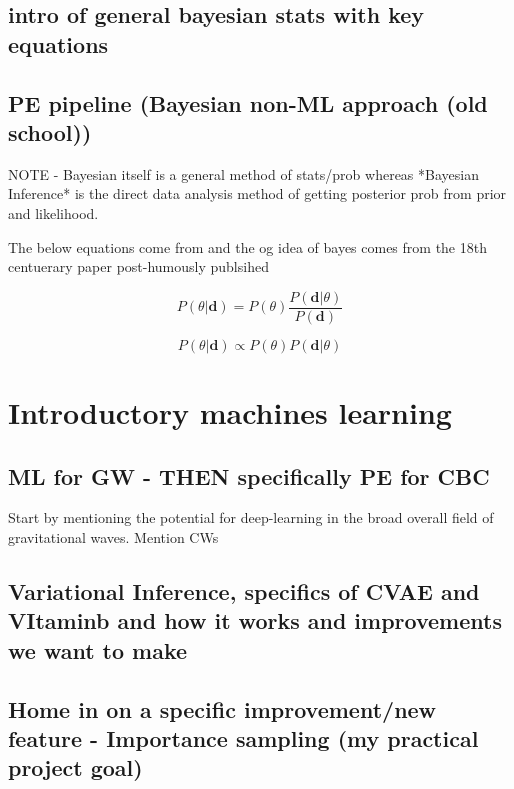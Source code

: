 \documentclass[11pt]{article}
\begin{document}
\subsection{intro of general bayesian stats with key equations}

\subsection{PE pipeline (Bayesian non-ML approach (old school))}
NOTE - Bayesian itself is a general method of stats/prob whereas *Bayesian Inference* is the direct data analysis method of getting posterior prob from prior and likelihood.

The below equations come from \cite{sivia2006textbook} and the og idea of bayes comes from the 18th centuerary paper post-humously publsihed \cite{bayesog}

\begin{equation}
\label{eq:bayes_equal}
P(\theta|\textbf{d}) = P(\theta ) \frac{P(\textbf{d} |\theta)}{P(\textbf{d})}
\end{equation}

\begin{equation}
\label{eq:bayes_propto}
P(\theta|\textbf{d}) \propto P(\theta ){P(\textbf{d} |\theta)}
\end{equation}

\section{Introductory machines learning}

\subsection{ML for GW - THEN specifically PE for CBC}

Start by mentioning the potential for deep-learning in the broad overall field of gravitational waves. Mention CWs



\subsection{Variational Inference, specifics of CVAE and VItaminb and how it works and improvements we want to make}

\subsection{Home in on a specific improvement/new feature - Importance sampling (my practical project goal)}
\end{document}
